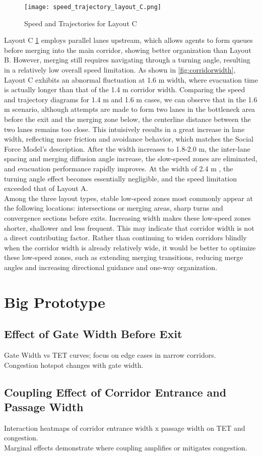 \begin{figure}[h]
    \centering
    \texttt{[image: speed\_trajectory\_layout\_C.png]}
    \caption{Speed and Trajectories for Layout C}
    \label{fig:speed_trajectory_layout_C}
\end{figure}
Layout C \ref{fig:speed_trajectory_layout_C} employs parallel lanes upstream, which allows agents to form queues before merging into the main corridor, showing better organization than Layout B. However, merging still requires navigating through a turning angle, resulting in a relatively low overall speed limitation. As shown in \ref{fig:corridorwidth}, Layout C exhibits an abnormal fluctuation at 1.6 m width, where evacuation time is actually longer than that of the 1.4 m corridor width. Comparing the speed and trajectory diagrams for 1.4 m and 1.6 m cases, we can observe that in the 1.6 m scenario, although attempts are made to form two lanes in the bottleneck area before the exit and the merging zone below, the centerline distance between the two lanes remains too close. This intuisively results in a great increase in lane width, reflecting more friction and avoidance behavior, which matches the Social Force Model's description. After the width increases to 1.8-2.0 m, the inter-lane spacing and merging diffusion angle increase, the slow-speed zones are eliminated, and evacuation performance rapidly improves. At the width of 2.4 m , the turning angle effect becomes essentially negligible, and the speed limitation exceeded that of Layout A.
\\Among the three layout types, stable low-speed zones most commonly appear at the following locations: intersections or merging areas, sharp turns and convergence sections before exits. Increasing width makes these low-speed zones shorter, shallower and less frequent. This may indicate that corridor width is not a direct contributing factor. Rather than continuing to widen corridors blindly when the corridor width is already relatively wide, it would be better to optimize these low-speed zones, such as extending merging transitions, reducing merge angles and increasing directional guidance and one-way organization.
\section{Big Prototype}

\subsection{Effect of Gate Width Before Exit}
Gate Width vs TET curves; focus on edge cases in narrow corridors.
\\Congestion hotspot changes with gate width.
\subsection{Coupling Effect of Corridor Entrance and Passage Width}
Interaction heatmaps of corridor entrance width x passage width on TET and congestion.
\\Marginal effects demonstrate where coupling amplifies or mitigates congestion.